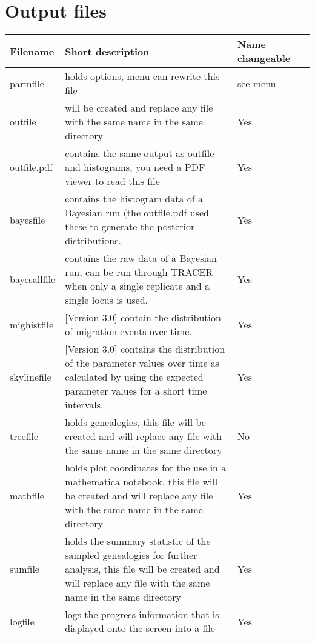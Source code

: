 \section{Output files}
\begin{center}
\begin{tabular}{l p{8.0cm} l c}
\hline
Filename & Short description & Name changeable\\
\hline
parmfile     & {holds options, menu can rewrite this file}  & see menu\\
outfile           & {will be created and replace any file with the same name in the same directory}  & Yes\\
outfile.pdf          & contains the same output as outfile and histograms, you need a PDF viewer to read this file  & Yes\\
bayesfile & contains the histogram data of a Bayesian run (the outfile.pdf used these to generate the posterior distributions. & Yes\\
bayesallfile & contains the raw data of a Bayesian run, can be run through TRACER when only a single replicate and a single locus is used. & Yes\\
mighistfile & [Version 3.0] contain the distribution of migration events over time. & Yes\\
skylinefile & [Version 3.0] contains the distribution of the parameter values over time as calculated by using the expected parameter values for a short time intervals. & Yes\\
treefile         & {holds genealogies, this file will be created and will replace any file with the same name in the same directory} & No\\
mathfile        & {holds plot coordinates for the use in a mathematica notebook, this file will be created and will replace any file with the same name in the same directory} & Yes\\
sumfile         & {holds the summary statistic of the sampled  genealogies for further analysis, this file will be created and will replace any file with the same name in the same directory} & Yes\\
logfile  &  {logs the progress information that is displayed onto the screen into a file} & Yes\\
\hline
\end{tabular}
\end{center}
